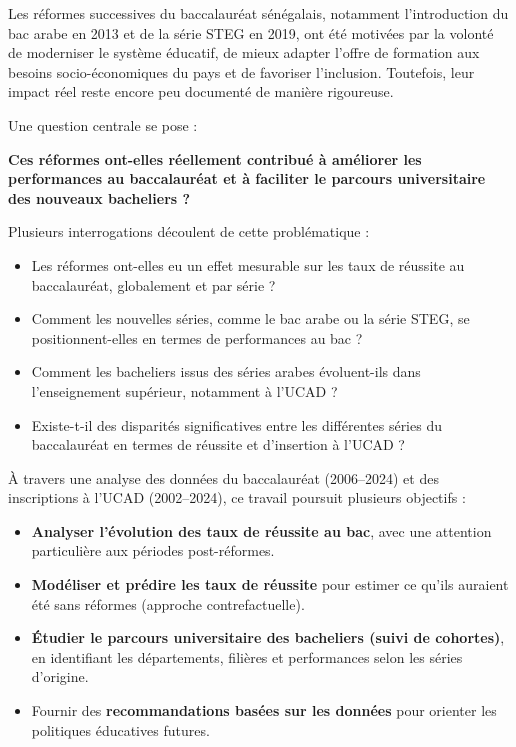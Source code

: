 Les réformes successives du baccalauréat sénégalais, notamment l’introduction du bac arabe en 2013 et de la série STEG en 2019,
ont été motivées par la volonté de moderniser le système éducatif, de mieux adapter l’offre de formation aux besoins socio-économiques du pays et de favoriser l’inclusion. 
Toutefois, leur impact réel reste encore peu documenté de manière rigoureuse.

Une question centrale se pose :

\textbf{Ces réformes ont-elles réellement contribué à améliorer les performances au baccalauréat et à faciliter le parcours universitaire des nouveaux bacheliers ?}

Plusieurs interrogations découlent de cette problématique :
\begin{itemize}
    \item Les réformes ont-elles eu un effet mesurable sur les taux de réussite au baccalauréat, globalement et par série ?
    \item Comment les nouvelles séries, comme le bac arabe ou la série STEG, se positionnent-elles en termes de performances au bac ?
    \item Comment les bacheliers issus des séries arabes évoluent-ils dans l’enseignement supérieur, notamment à l’UCAD ?
    \item Existe-t-il des disparités significatives entre les différentes séries du baccalauréat en termes de réussite et d’insertion à l'UCAD ?
\end{itemize}

À travers une analyse des données du baccalauréat (2006–2024) et des inscriptions à l’UCAD (2002–2024), ce travail poursuit plusieurs objectifs :
\begin{itemize}
    \item \textbf{Analyser l’évolution des taux de réussite au bac}, avec une attention particulière aux périodes post-réformes.
    \item \textbf{Modéliser et prédire les taux de réussite} pour estimer ce qu’ils auraient été sans réformes (approche contrefactuelle).
    \item \textbf{Étudier le parcours universitaire des bacheliers (suivi de cohortes)}, en identifiant les départements, filières et performances selon les séries d’origine.
    \item Fournir des \textbf{recommandations basées sur les données} pour orienter les politiques éducatives futures.
\end{itemize}

